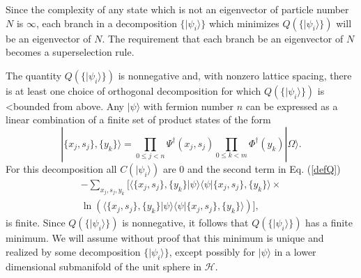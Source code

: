 \documentclass[12pt,amsmath,amssymb,onecolumn]{revtex4-2}
\begin{document}
Since the complexity of any state which is not an eigenvector of particle number $N$
is $\infty$, each branch in a decomposition $\{|\psi_i \rangle \}$ which minimizes
$Q( \{|\psi_i \rangle \})$ will be an eigenvector of $N$.
The requirement that each branch be an eigenvector of $N$
becomes a superselection rule.


The quantity $Q( \{|\psi_i \rangle \})$ is nonnegative and, with
nonzero lattice spacing, there is at least
one choice of orthogonal decomposition for which
$Q( \{|\psi_i \rangle \})$ is
<bounded from above.
Any $|\psi \rangle $ with fermion number $n$ can be expressed as a linear
combination of a finite set of product states of the form
\begin{equation}
\label{particlesatpoints}
|\{x_j, s_j\}, \{y_k\} \rangle  = \prod_{0 \le j < n} \Psi^{\dagger}( x_j, s_j) \prod_{0 \le k < m} \Phi^{\dagger}( y_k) |\Omega \rangle .
\end{equation}
For this decomposition all $C( |\psi_i \rangle )$ are 0
and the second term in Eq. (\ref{defQ})
\begin{multline}
\label{pointstates1}
-\sum_{x_j,s_j, y_k} [ \langle  \{x_j,s_j\}, \{y_k\}|\psi \rangle  \langle \psi|\{x_j,s_j\},\{ y_k\} \rangle  \times \\
\ln ( \langle  \{x_j,s_j\}, \{y_k\}|\psi \rangle  \langle \psi|\{x_j,s_j\}, \{y_k\} \rangle )],
\end{multline}
is finite.
Since $Q( \{|\psi_i \rangle \})$ is nonnegative, it follows that $Q( \{|\psi_i \rangle \})$ has 
a finite minimum.
We will assume without proof that
this minimum is unique and realized by some
decomposition $\{ |\psi_i \rangle  \}$, except possibly for  $|\psi \rangle $ in a lower
dimensional submanifold of the unit sphere in $\mathcal{H}$.
\end{document}
